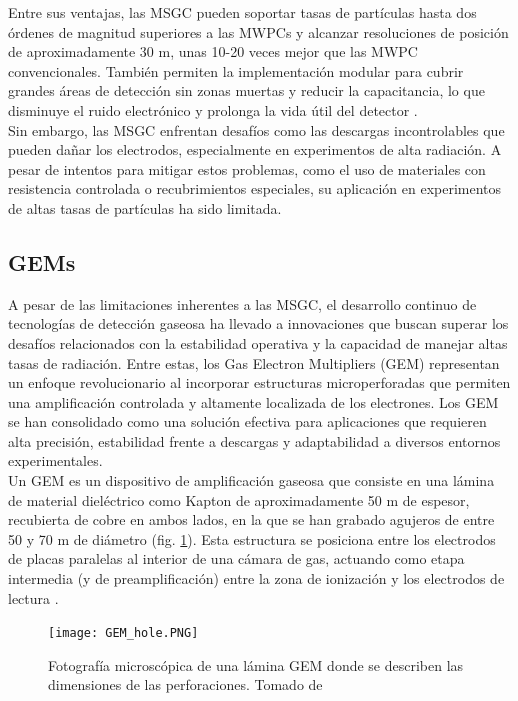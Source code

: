 \documentclass{article}
\begin{document}
\noindent Entre sus ventajas, las MSGC pueden soportar tasas de partículas hasta dos órdenes de magnitud superiores a las MWPCs y alcanzar resoluciones de posición de aproximadamente 30 \textmu m, unas 10-20 veces mejor que las MWPC convencionales. También permiten la implementación modular para cubrir grandes áreas de detección sin zonas muertas y reducir la capacitancia, lo que disminuye el ruido electrónico y prolonga la vida útil del detector \cite{giomataris1996micromegas}.\\

\noindent Sin embargo, las MSGC enfrentan desafíos como las descargas incontrolables que pueden dañar los electrodos, especialmente en experimentos de alta radiación. A pesar de intentos para mitigar estos problemas, como el uso de materiales con resistencia controlada o recubrimientos especiales, su aplicación en experimentos de altas tasas de partículas ha sido limitada.\\

\subsection{GEMs}

\noindent A pesar de las limitaciones inherentes a las MSGC, el desarrollo continuo de tecnologías de detección gaseosa ha llevado a innovaciones que buscan superar los desafíos relacionados con la estabilidad operativa y la capacidad de manejar altas tasas de radiación. Entre estas, los Gas Electron Multipliers (GEM) representan un enfoque revolucionario al incorporar estructuras microperforadas que permiten una amplificación controlada y altamente localizada de los electrones. Los GEM se han consolidado como una solución efectiva para aplicaciones que requieren alta precisión, estabilidad frente a descargas y adaptabilidad a diversos entornos experimentales. \\

\noindent Un GEM es un dispositivo de amplificación gaseosa que consiste en una lámina de material dieléctrico como Kapton de aproximadamente 50 \textmu m de espesor, recubierta de cobre en ambos lados, en la que se han grabado agujeros de entre 50 y 70 \textmu m de diámetro (fig. \ref{fig:gem_hole}). Esta estructura se posiciona entre los electrodos de placas paralelas al interior de una cámara de gas, actuando como etapa intermedia (y de preamplificación) entre la zona de ionización y los electrodos de lectura \cite{kolanoski2020particle4}.

\begin{figure}[H]
    \centering
    \texttt{[image: GEM\_hole.PNG]}
    \caption{Fotografía microscópica de una lámina GEM donde se describen las dimensiones de las perforaciones. Tomado de \cite{sauli1997gem} }
    \label{fig:gem_hole}
\end{figure}
\end{document}
